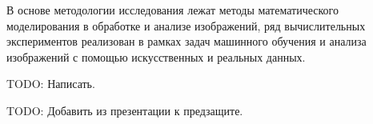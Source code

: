 {\methods} 

В основе методологии исследования лежат методы математического моделирования в обработке и анализе изображений, ряд вычислительных экспериментов реализован в рамках задач машинного обучения и анализа изображений с помощью искусственных и реальных данных.

{\reliability}
TODO: Написать.

{\probation}
TODO: Добавить из презентации к предзащите.
%
%
%
%
%
%
%

